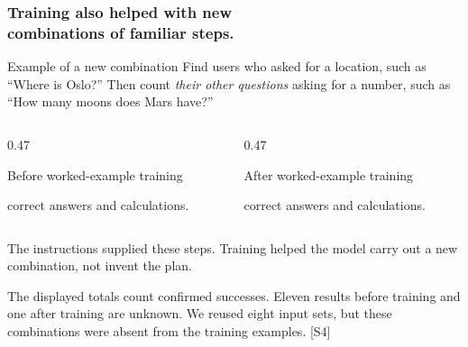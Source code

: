 \documentclass[aspectratio=169,11pt]{beamer}
\newcommand{\smallnote}[1]{\vfill{\scriptsize\color{Muted}#1\par}}
\begin{document}
\begin{frame}[t]
\frametitle{Training also helped with new\\combinations of familiar steps.}
\begin{block}{Example of a new combination}
Find users who asked for a location, such as ``Where is Oslo?'' Then count \emph{their other questions} asking for a number, such as ``How many moons does Mars have?''
\end{block}
\begin{columns}[T,onlytextwidth]
\begin{column}{0.47\textwidth}
\begin{block}{Before worked-example training}
\par
correct answers and calculations.
\end{block}
\end{column}
\begin{column}{0.47\textwidth}
\begin{block}{After worked-example training}
\par
correct answers and calculations.
\end{block}
\end{column}
\end{columns}
\vspace{3mm}
The instructions supplied these steps. Training helped the model carry out a new combination, not invent the plan.
\smallnote{The displayed totals count confirmed successes. Eleven results before training and one after training are unknown. We reused eight input sets, but these combinations were absent from the training examples. [S4]}
\end{frame}
\end{document}
